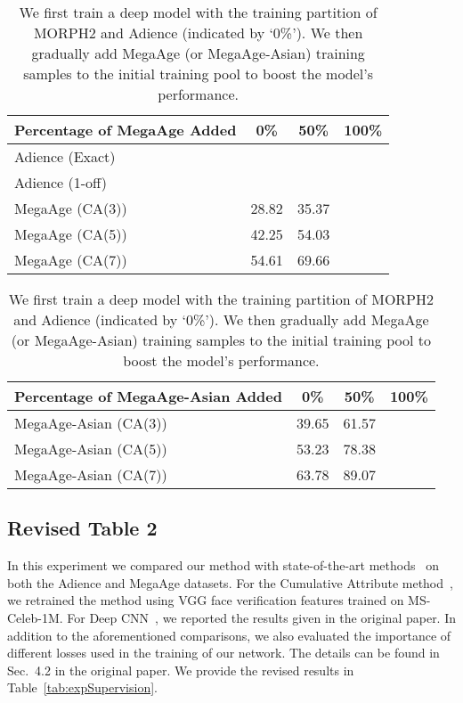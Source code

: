 \documentclass{bmvc2k}
\begin{document}
\begin{table}[t]
	\small
	\begin{center}
		\caption{We first train a deep model with the training partition of MORPH2 and Adience (indicated by `0\%'). We then gradually add MegaAge (or MegaAge-Asian) training samples to the initial training pool to boost the model's performance.}
\begin{tabular}{l|ccc}
		\hline

			Percentage of MegaAge Added &  0\% & 50\%  & 100\%  \\
			\hline \hline
			Adience (Exact) &  &  &  \\ 
			Adience (1-off) &  &  &   \\ \hline
			MegaAge (CA(3)) & 28.82 & 35.37 &   \\ 
			MegaAge (CA(5)) & 42.25 & 54.03 &  \\
			MegaAge (CA(7)) & 54.61 & 69.66 &  \\ \hline
		\end{tabular}
		
		\begin{tabular}{l|ccc}
		\hline

			Percentage of MegaAge-Asian Added &  0\% & 50\%  & 100\%  \\
			\hline \hline
			MegaAge-Asian (CA(3)) & 39.65 & 61.57 &   \\ 
			MegaAge-Asian (CA(5)) & 53.23 & 78.38 &  \\
			MegaAge-Asian (CA(7)) & 63.78 & 89.07 &  \\ \hline
		\end{tabular}
		\label{tab:expSupervision1}
	\end{center}
\end{table}  
  
\subsection*{Revised Table 2}


In this experiment we compared our method with state-of-the-art methods~\cite{chen2013cumulative,eidinger2014age,levi2015age} on both the Adience and MegaAge datasets. For the Cumulative Attribute method~\cite{chen2013cumulative}, we retrained the method using VGG face verification features trained on MS-Celeb-1M. For Deep CNN~\cite{levi2015age}, we reported the results given in the original paper.
In addition to the aforementioned comparisons, we also evaluated the importance of different losses used in the training of our network. The details can be found in Sec.~4.2 in the original paper. We provide the revised results in Table~\ref{tab:expSupervision}.
\end{document}
